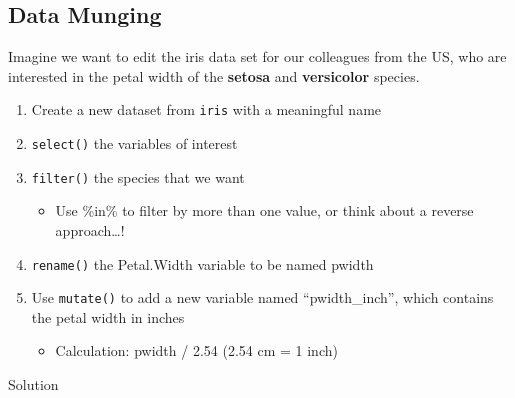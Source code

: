 \documentclass[
]{book}
\providecommand{\tightlist}{%
  \setlength{\itemsep}{0pt}\setlength{\parskip}{0pt}}
\begin{document}
\subsection*{Data Munging}\label{data-munging}

Imagine we want to edit the iris data set for our colleagues from the US, who are interested in the petal width of the \textbf{setosa} and \textbf{versicolor} species.

\begin{enumerate}
\def\labelenumi{\arabic{enumi}.}
\tightlist
\item
  Create a new dataset from \texttt{iris} with a meaningful name
\item
  \texttt{select()} the variables of interest
\item
  \texttt{filter()} the species that we want

  \begin{itemize}
  \tightlist
  \item
    Use \%in\% to filter by more than one value, or think about a reverse approach\ldots!
  \end{itemize}
\item
  \texttt{rename()} the Petal.Width variable to be named pwidth
\item
  Use \texttt{mutate()} to add a new variable named ``pwidth\_inch'', which contains the petal width in inches

  \begin{itemize}
  \tightlist
  \item
    Calculation: pwidth / 2.54 (2.54 cm = 1 inch)
  \end{itemize}
\end{enumerate}

Solution
\end{document}
